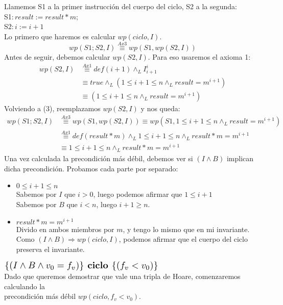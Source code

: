 \documentclass{article}
\begin{document}
\begin{enumerate}[label=\alph*)]
	Llamemos S1 a la primer instrucción del cuerpo del ciclo, S2 a la segunda:\\
	S1$: result:=result*m;$\\
	S2$: i:=i+1$\\
	Lo primero que haremos es calcular $wp(ciclo,I)$.
	\begin{equation}wp(S1;S2,I)\stackrel{Ax3}{\equiv}wp(S1,wp(S2,I))\end{equation}
	Antes de seguir, debemos calcular $wp(S2,I)$. Para eso usaremos el axioma 1:
	\begin{align*}
	wp(S2,I)&\stackrel{Ax1}{\equiv}def(i+1)\wedge_L I_{i+1}^{i}\\
		&\equiv true\wedge_L (1\leq i+1\leq n \wedge_L result=m^{i+1})\\
		&\equiv (1\leq i+1\leq n \wedge_L result=m^{i+1})
	\end{align*}
	Volviendo a (3), reemplazamos $wp(S2,I)$ y nos queda:
	\begin{align*}
	wp(S1;S2,I)&\stackrel{Ax3}{\equiv}wp(S1,wp(S2,I))\equiv wp(S1,1\leq i+1\leq n \wedge_L result=m^{i+1})\\
		&\stackrel{Ax1}{\equiv}def(result*m)\wedge_L 1\leq i+1\leq n \wedge_L result*m=m^{i+1}\\
		&\equiv 1\leq i+1\leq n \wedge_L result*m=m^{i+1}
	\end{align*}
	Una vez calculada la precondición más débil, debemos ver si $(I\wedge B)$ implican dicha precondición. Probamos cada
	parte por separado:
	\begin{itemize}
		\item $ 0\leq i+1\leq n$\smallskip \\
		Sabemos por $I$ que $ i>0$, luego podemos afirmar que $1\leq i+1$\\
		Sabemos por $B$ que $i<n$, luego $i+1\geq n$.
		\item $result*m=m^{i+1}$\smallskip \\
		Divido en ambos miembros por $m$, y tengo lo mismo que en mi invariante.\smallskip \\
		Como $(I\wedge B) \Rightarrow wp(ciclo,I)$, podemos afirmar que el cuerpo del ciclo preserva el invariante.
	\end{itemize}
	$\scalebox{1.3}{$\{(I\wedge B\wedge v_0=f_v)\}\textbf{ ciclo }\{(f_v<v_0)\}$}$\medskip \\
	Dado que queremos demostrar que vale una tripla de Hoare, comenzaremos calculando la\\ precondición más débil $wp(ciclo,f_v<v_0)$.
	\begin{align*}

\end{align*}
\end{enumerate}
\end{document}
